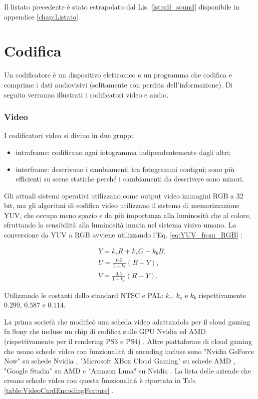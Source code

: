 Il listato precedente è stato estrapolato dal Lis. \ref{lst:sdl_sound} disponibile in appendice \ref{chap:Listato}.




\section{Codifica} \label{chap:Implementazione_Codifica}
Un codificatore è un dispositivo elettronico o un programma che codifica e comprime i dati audiovisivi (solitamente con perdita dell'informazione). Di seguito verranno illustrati i codificatori video e audio.

\subsubsection{Video}
I codificatori video si divino in due gruppi:

\begin{itemize}
    \item intraframe: codificano ogni fotogramma indipendentemente dagli altri;
    \item interframe: descrivono i cambiamenti tra fotogrammi contigui; sono più efficienti su scene statiche perché i cambiamenti da descrivere sono minori.
\end{itemize}

Gli attuali sistemi operativi utilizzano come output video immagini RGB a 32 bit, ma gli algoritmi di codifica video utilizzano il sistema di memorizzazione YUV, che occupa meno spazio e da più importanza alla luminosità che al colore, sfruttando la sensibilità alla luminosità innata nel sistema visivo umano. La conversione da YUV a RGB avviene utilizzando l'Eq. \ref{eq:YUV_from_RGB} \parencite{alma991017214718006031}:

\begin{equation} \label{eq:YUV_from_RGB}
	\begin{aligned}
		& Y = k_r R + k_s G + k_b B, \\	
		& U = \frac{0.5}{1 - k_b} (B - Y), \\
		& V = \frac{0.5}{1 - k_r} (R - Y).	
	\end{aligned}
\end{equation}

Utilizzando le costanti dello standard NTSC e PAL: $k_r$, $k_s$ e $k_b$ rispettivamente $0.299$, $0.587$ e $0.114$.

La prima società che modificò una scheda video adattandola per il cloud gaming fu Sony che incluse un chip di codifica sulle GPU Nvidia ed AMD (rispettivamente per il rendering PS3 e PS4) \parencite{PlayStation_Now_Chip}. Altre piattaforme di cloud gaming che usano schede video con funzionalità di encoding incluse sono "Nvidia GeForce Now" su schede Nvidia \parencite{GeForce_Now}, "Microsoft XBox Cloud Gaming" su schede AMD \parencite{xCloudBlade}, "Google Stadia" su AMD \parencite{Google_Stadia_Server} e "Amazon Luna" su Nvidia \parencite{Amazon_Luna_GPU}. La lista delle aziende che creano schede video con questa funzionalità è riportata in Tab. \ref{table:VideoCardEncodingFeature} \parencite{NVIDIAVideoCodecSDK} \parencite{GCNArchitecture} \parencite{IntelQuickSyncVideo} \parencite{Hexagon_DSP_SDK}.

